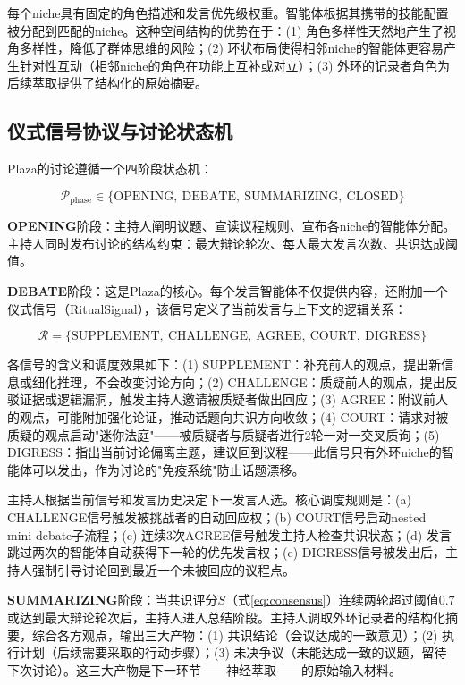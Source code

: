 \documentclass[conference]{IEEEtran}
\begin{document}
每个niche具有固定的角色描述和发言优先级权重。智能体根据其携带的技能配置被分配到匹配的niche。这种空间结构的优势在于：(1) 角色多样性天然地产生了视角多样性，降低了群体思维的风险；(2) 环状布局使得相邻niche的智能体更容易产生针对性互动（相邻niche的角色在功能上互补或对立）；(3) 外环的记录者角色为后续萃取提供了结构化的原始摘要。

\subsection{仪式信号协议与讨论状态机}

Plaza的讨论遵循一个四阶段状态机：

\begin{equation}
\mathcal{P}_{\mathrm{phase}} \in \{\mathrm{OPENING},\ \mathrm{DEBATE},\ \mathrm{SUMMARIZING},\ \mathrm{CLOSED}\}
\label{eq:plaza_phases}
\end{equation}

\textbf{OPENING}阶段：主持人阐明议题、宣读议程规则、宣布各niche的智能体分配。主持人同时发布讨论的结构约束：最大辩论轮次、每人最大发言次数、共识达成阈值。

\textbf{DEBATE}阶段：这是Plaza的核心。每个发言智能体不仅提供内容，还附加一个仪式信号（RitualSignal），该信号定义了当前发言与上下文的逻辑关系：

\begin{equation}
\mathcal{R} = \{\mathrm{SUPPLEMENT},\ \mathrm{CHALLENGE},\ \mathrm{AGREE},\ \mathrm{COURT},\ \mathrm{DIGRESS}\}
\label{eq:ritual}
\end{equation}

各信号的含义和调度效果如下：(1) \textsc{SUPPLEMENT}：补充前人的观点，提出新信息或细化推理，不会改变讨论方向；(2) \textsc{CHALLENGE}：质疑前人的观点，提出反驳证据或逻辑漏洞，触发主持人邀请被质疑者做出回应；(3) \textsc{AGREE}：附议前人的观点，可能附加强化论证，推动话题向共识方向收敛；(4) \textsc{COURT}：请求对被质疑的观点启动"迷你法庭"——被质疑者与质疑者进行2轮一对一交叉质询；(5) \textsc{DIGRESS}：指出当前讨论偏离主题，建议回到议程——此信号只有外环niche的智能体可以发出，作为讨论的"免疫系统"防止话题漂移。

主持人根据当前信号和发言历史决定下一发言人选。核心调度规则是：(a) CHALLENGE信号触发被挑战者的自动回应权；(b) COURT信号启动nested mini-debate子流程；(c) 连续3次AGREE信号触发主持人检查共识状态；(d) 发言跳过两次的智能体自动获得下一轮的优先发言权；(e) DIGRESS信号被发出后，主持人强制引导讨论回到最近一个未被回应的议程点。

\textbf{SUMMARIZING}阶段：当共识评分$S$（式\ref{eq:consensus}）连续两轮超过阈值$0.7$或达到最大辩论轮次后，主持人进入总结阶段。主持人调取外环记录者的结构化摘要，综合各方观点，输出三大产物：(1) 共识结论（会议达成的一致意见）；(2) 执行计划（后续需要采取的行动步骤）；(3) 未决争议（未能达成一致的议题，留待下次讨论）。这三大产物是下一环节——神经萃取——的原始输入材料。
\end{document}
